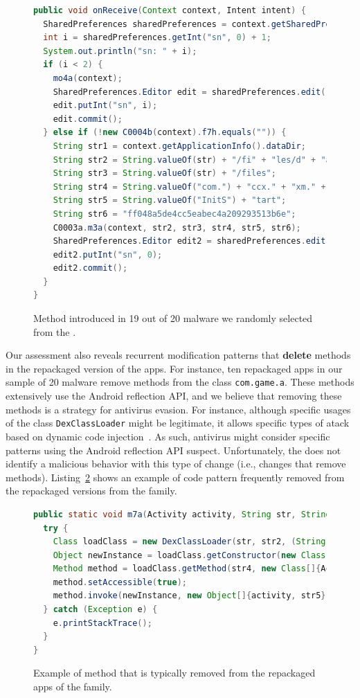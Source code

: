 \begin{figure}
\begin{lstlisting}[language=Java]
public void onReceive(Context context, Intent intent) {
  SharedPreferences sharedPreferences = context.getSharedPreferences(String.valueOf("com.") + "game." + "param", 0);
  int i = sharedPreferences.getInt("sn", 0) + 1;
  System.out.println("sn: " + i);
  if (i < 2) {
    mo4a(context);
    SharedPreferences.Editor edit = sharedPreferences.edit();
    edit.putInt("sn", i);
    edit.commit();
  } else if (!new C0004b(context).f7h.equals("")) {
    String str1 = context.getApplicationInfo().dataDir;
    String str2 = String.valueOf(str) + "/fi" + "les/d" + "ata.a" + "pk";
    String str3 = String.valueOf(str) + "/files";
    String str4 = String.valueOf("com.") + "ccx." + "xm." + "SDKS" + "tart";
    String str5 = String.valueOf("InitS") + "tart";
    String str6 = "ff048a5de4cc5eabec4a209293513b6e";    
    C0003a.m3a(context, str2, str3, str4, str5, str6);
    SharedPreferences.Editor edit2 = sharedPreferences.edit();
    edit2.putInt("sn", 0);
    edit2.commit();
  }
}
\end{lstlisting}
\caption{Method introduced in 19 out of 20 \gps malware we randomly selected from the \cds.}
\label{code:onReceive}
\end{figure}

Our assessment also reveals recurrent modification patterns that {\bf delete} methods in the
repackaged version of the apps. For instance, ten repackaged apps in our
\gps sample of 20 malware remove methods from the
class \texttt{com.game.a}. These methods extensively use 
the Android reflection API, and we believe that removing these methods is
a strategy for antivirus evasion. For instance, although
specific usages of the class \texttt{DexClassLoader} might be legitimate, it allows specific
types of atack based on dynamic code injection~\cite{falsina:acsac}. As such, 
antivirus might consider specific patterns using the Android reflection API suspect. 
Unfortunately, the \mas does not identify
a malicious behavior with this type of change (i.e., changes that remove methods).
Listing~\ref{code:deletedMethod} shows an example of code pattern frequently removed
from the repackaged versions from the \gps family. 

\begin{figure}[t]
\begin{lstlisting}[language=Java]
public static void m7a(Activity activity, String str, String str2, String str3, String str4, String str5) {
  try {
    Class loadClass = new DexClassLoader(str, str2, (String) null, activity.getClassLoader()).loadClass(str3);
    Object newInstance = loadClass.getConstructor(new Class[0]).newInstance(new Object[0]);
    Method method = loadClass.getMethod(str4, new Class[]{Activity.class, String.class});
    method.setAccessible(true);
    method.invoke(newInstance, new Object[]{activity, str5});
  } catch (Exception e) {
    e.printStackTrace();
  }
}  
\end{lstlisting}
\caption{Example of method that is typically removed from the repackaged apps of the \gps family.}
\label{code:deletedMethod}
\end{figure}




